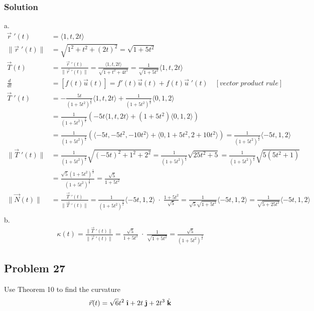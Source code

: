 \documentclass{article}
\newcommand{\ihat}{\;\hat{\textbf{\i}}}
\newcommand{\jhat}{\;\hat{\textbf{\j}}}
\newcommand{\khat}{\;\hat{\textbf{k}}}
\newcommand{\rvec}{\vec{r}(t)}
\newcommand{\drvec}{\vec{r}\;'(t)}
\begin{document}
\subsubsection*{Solution}
a. 
\begin{align*}
    \drvec &= \langle 1, t, 2t \rangle \\
    \|\drvec\| &= \sqrt{1^2 + t^2 + (2t)^2} = \sqrt{1 + 5t^2} \\ 
    \vec T(t) &= \frac{\drvec}{\|\drvec\|} = \frac{\langle 1, t, 2t \rangle}{\sqrt{1 + t^2 + 4t^2}} = \frac{1}{\sqrt{1 + 5t^2}}\langle 1, t, 2t \rangle \\
    \frac{d}{dt} &= [f(t)\vec u (t)] = f'(t)\vec u (t) + f(t)\vec u \;'(t) \quad [vector\;product\;rule] \\  
    \vec T\;'(t) &= -\frac{5t}{(1+5t^2)^{\frac 3 2}}\langle 1, t, 2t\rangle + \frac{1}{(1+5t^2)^\frac 1 2}\langle 0, 1, 2 \rangle \\
                 &= \frac{1}{(1+5t^2)^{\frac 3 2}}\left(-5t \langle 1, t, 2t \rangle + (1+5t^2)\langle 0, 1, 2 \rangle\right) \\
                 &= \frac{1}{(1+5t^2)^{\frac 3 2}}\left(\langle -5t, -5t^2, -10t^2 \rangle + \langle 0, 1+5t^2, 2+10t^2 \rangle\right) = \frac{1}{(1+5t^2)^{\frac 3 2}} \langle -5t, 1, 2 \rangle \\
    \|\vec T\;'(t)\| &= \frac{1}{(1+5t^2)^{\frac 3 2}}\sqrt{(-5t)^2 + 1^2 + 2^2} = \frac{1}{(1+5t^2)^{\frac 3 2}}\sqrt{25t^2 + 5} = \frac{1}{(1+5t^2)^{\frac 3 2}}\sqrt{5(5t^2 + 1)} \\
                     &= \frac{\sqrt 5 (1+5t^2)^{\frac 1 2}}{(1+5t^2)^{\frac 3 2}} = \frac{\sqrt 5}{1+5t^2} \\
    \|\vec N(t)\| &=  \frac{\vec T\;'(t)}{\|\vec T\;'(t)\|} = \frac{1}{(1+5t^2)^{\frac 3 2}} \langle -5t, 1, 2 \rangle \; \cdot \; \frac{1+5t^2}{\sqrt 5} = \frac{1}{\sqrt 5\sqrt{1+5t^2}} \langle -5t, 1, 2 \rangle  = \frac{1}{\sqrt{5+25t^2}}\langle -5t, 1, 2 \rangle\\ 
\end{align*}
b.
\begin{align*}
    \kappa(t) = \frac{\|\vec T\;'(t)\|}{\|\drvec\|} = \frac{\sqrt 5}{1+5t^2} \; \cdot \; \frac{1}{\sqrt{1+5t^2}} = \frac{\sqrt 5}{(1+5t^2)^{\frac 3 2}}
\end{align*}
\subsection*{Problem 27}
Use Theorem 10 to find the curvature
\[
    \rvec = \sqrt{6}t^2\ihat + 2t\jhat + 2t^3\khat
\]
\end{document}
